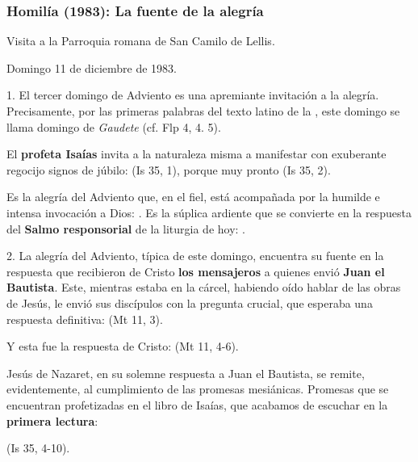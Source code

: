 \subsubsection{Homilía (1983): La fuente de la alegría}

Visita a la Parroquia romana de San Camilo de Lellis.

Domingo 11 de diciembre de 1983.

1. El tercer domingo de Adviento es una apremiante invitación a la alegría. Precisamente, por las primeras palabras del texto latino de la , este domingo se llama domingo de \emph{Gaudete} (cf. Flp 4, 4. 5).

El \textbf{profeta Isaías} invita a la naturaleza misma a manifestar con exuberante regocijo signos de júbilo:  (Is 35, 1), porque muy pronto  (Is 35, 2).

Es la alegría del Adviento que, en el fiel, está acompañada por la humilde e intensa invocación a Dios: . Es la súplica ardiente que se convierte en la respuesta del \textbf{Salmo responsorial} de la liturgia de hoy: .

2. La alegría del Adviento, típica de este domingo, encuentra su fuente en la respuesta que recibieron de Cristo \textbf{los mensajeros} a quienes envió \textbf{Juan el Bautista}. Este, mientras estaba en la cárcel, habiendo oído hablar de las obras de Jesús, le envió sus discípulos con la pregunta crucial, que esperaba una respuesta definitiva:  (Mt 11, 3).

Y esta fue la respuesta de Cristo:  (Mt 11, 4-6).

Jesús de Nazaret, en su solemne respuesta a Juan el Bautista, se remite, evidentemente, al cumplimiento de las promesas mesiánicas. Promesas que se encuentran profetizadas en el libro de Isaías, que acabamos de escuchar en la \textbf{primera lectura}:

 (Is 35, 4-10).

